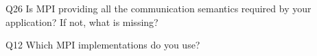 \begin{description}%
\item{Q26} Is MPI providing all the communication semantics required by your application? If not, what is missing?%
\item{Q12} Which MPI implementations do you use?%
\end{description}%
